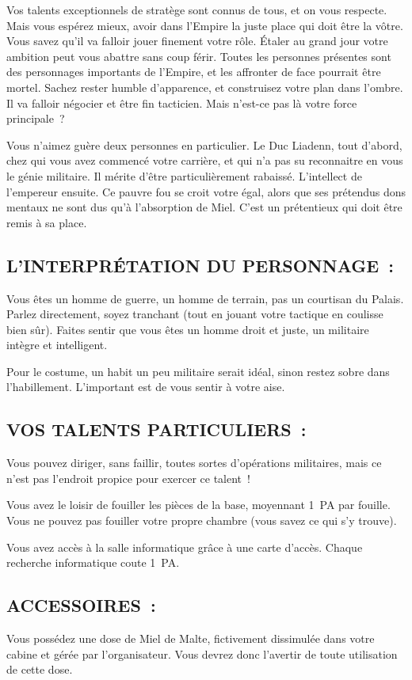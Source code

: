 \documentclass[14pt,twocolumn]{extarticle}
\begin{document}
Vos talents exceptionnels de stratège sont connus de tous, et on vous respecte.
Mais vous espérez mieux, avoir dans l'Empire la juste place qui doit être la
vôtre. Vous savez qu'il va falloir jouer finement votre rôle. Étaler au grand
jour votre ambition peut vous abattre sans coup férir. Toutes les personnes
présentes sont des personnages importants de l'Empire, et les affronter de face
pourrait être mortel. Sachez rester humble d'apparence, et construisez votre
plan dans l'ombre. Il va falloir négocier et être fin tacticien. Mais n'est-ce
pas là votre force principale~?

Vous n'aimez guère deux personnes en particulier. Le Duc Liadenn, tout d'abord,
chez qui vous avez commencé votre carrière, et qui n'a pas su reconnaitre en
vous le génie militaire. Il mérite d'être particulièrement rabaissé.
L'intellect de l'empereur ensuite. Ce pauvre fou se croit votre égal, alors que
ses prétendus dons mentaux ne sont dus qu'à l'absorption de Miel. C'est un
prétentieux qui doit être remis à sa place.

\subsection{L'INTERPRÉTATION DU PERSONNAGE~:}

Vous êtes un homme de guerre, un homme de terrain, pas un courtisan du Palais.
Parlez directement, soyez tranchant (tout en jouant votre tactique en coulisse
bien sûr). Faites sentir que vous êtes un homme droit et juste, un militaire
intègre et intelligent.

Pour le costume, un habit un peu militaire serait idéal, sinon restez sobre
dans l'habillement. L'important est de vous sentir à votre aise.

\subsection{VOS TALENTS PARTICULIERS~:}

Vous pouvez diriger, sans faillir, toutes sortes d'opérations militaires, mais
ce n'est pas l'endroit propice pour exercer ce talent~!

Vous avez le loisir de fouiller les pièces de la base, moyennant 1~PA par
fouille. Vous ne pouvez pas fouiller votre propre chambre (vous savez ce qui
s'y trouve).

Vous avez accès à la salle informatique grâce à une carte d'accès. Chaque
recherche informatique coute 1~PA.

\subsection{ACCESSOIRES~:}

Vous possédez une dose de Miel de Malte, fictivement dissimulée dans votre
cabine et gérée par l'organisateur. Vous devrez donc l'avertir de toute
utilisation de cette dose.
\end{document}
